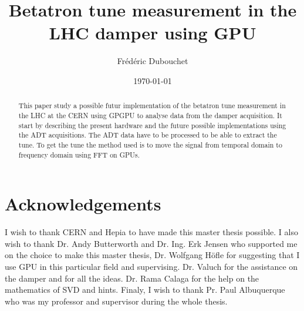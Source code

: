 \documentclass[a4paper]{report}
\title{Betatron tune measurement in the LHC damper using GPU}
\author{Fr{\'e}d{\'e}ric Dubouchet}
\date{\today}
\begin{document}
\maketitle

\begin{abstract}
	This paper study a possible futur implementation of the betatron tune measurement in the \gls{LHC} at the \gls{CERN} using \gls{GPGPU} to analyse data from the \gls{damper} acquisition. It start by describing the present hardware and the future possible implementations using the \gls{ADT} acquisitions. The \gls{ADT} data have to be processed to be able to extract the \gls{tune}. To get the tune the method used is to move the signal from temporal domain to frequency domain using \gls{FFT} on \glspl{GPU}.
\end{abstract}

\chapter*{Acknowledgements}
	I wish to thank \gls{CERN} and \gls{Hepia} to have made this master thesis possible. I also wish to thank Dr. Andy Butterworth and Dr. Ing. Erk Jensen who supported me on the choice to make this master thesis, Dr. Wolfgang H{\"o}fle for suggesting that I use GPU in this particular field and supervising. Dr. Valuch for the assistance on the damper and for all the ideas. Dr. Rama Calaga for the help on the mathematics of \gls{SVD} and hints. Finaly, I wish to thank Pr. Paul Albuquerque who was my professor and supervisor during the whole thesis.

\tableofcontents
\listoffigures
\listoftables








\printglossaries


\end{document}
